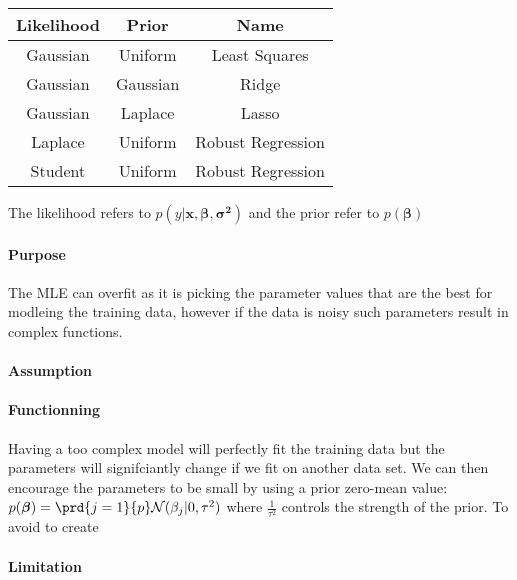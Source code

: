 \begin{tabular}{|*3{c|}}
    \hline
    \textbf{Likelihood} & \textbf{Prior} & \textbf{Name}\\
    \hline
    Gaussian & Uniform & Least Squares\\
    \hline
    Gaussian & Gaussian & Ridge\\
    \hline
    Gaussian & Laplace & Lasso\\
    \hline
    Laplace & Uniform & Robust Regression\\
    \hline
    Student & Uniform & Robust Regression\\
    \hline
\end{tabular}

The likelihood refers to $p(y|\bm{x},\bm{\beta},\bm{\sigma^{2}})$ and the prior refer to 
$p(\bm{\beta})$

\paragraph{Purpose}

The MLE can overfit as it is picking the parameter values that are the best for modleing 
the training data, however if the data is noisy such parameters result in complex 
functions.

\paragraph{Assumption}
\paragraph{Functionning}
Having a too complex model will perfectly fit the training data but the parameters will
signifciantly change if we fit on another data set. We can then encourage the parameters
to be small by using a prior zero-mean value:
$p(\bm{\beta}) = \prd{j=1}{p}\mathcal{N}(\beta_{j}|0, \tau^{2})$
where $\frac{1}{\tau^{2}}$ controls the strength of the prior.
To avoid to create 

\paragraph{Limitation}
